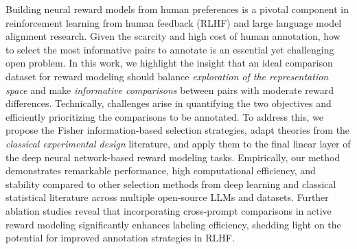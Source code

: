 

Building neural reward models from human preferences is a pivotal component in reinforcement learning from human feedback (RLHF) and large language model alignment research. Given the scarcity and high cost of human annotation, how to select the most informative pairs to annotate is an essential yet challenging open problem. 
In this work, we highlight the insight that an ideal comparison dataset for reward modeling should balance \textit{exploration of the representation space} and make \textit{informative comparisons} between pairs with moderate reward differences. Technically, challenges arise in quantifying the two objectives and efficiently prioritizing the comparisons to be annotated. To address this, we propose the Fisher information-based selection strategies, adapt theories from the \textit{classical experimental design} literature, and apply them to the final linear layer of the deep neural network-based reward modeling tasks. Empirically, our method demonstrates remarkable performance, high computational efficiency, and stability compared to other selection methods from deep learning and classical statistical literature across multiple open-source LLMs and datasets.
Further ablation studies reveal that incorporating cross-prompt comparisons in active reward modeling significantly enhances labeling efficiency, shedding light on the potential for improved annotation strategies in RLHF.